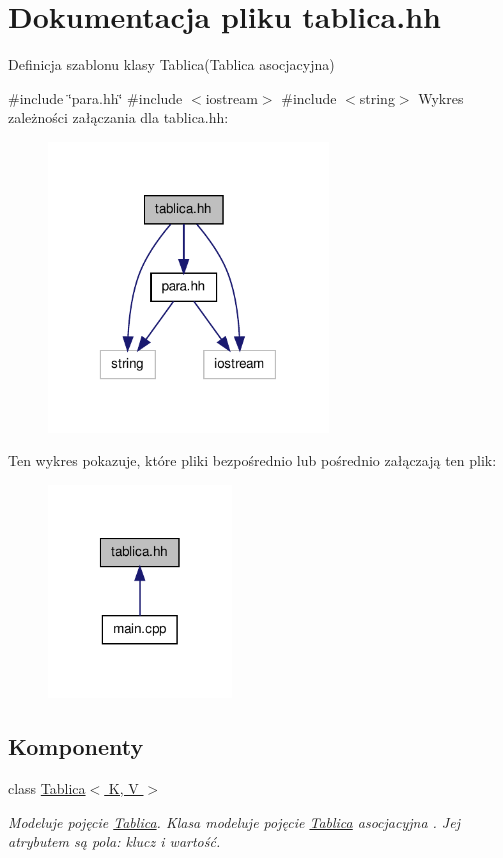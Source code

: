 \hypertarget{tablica_8hh}{\section{\-Dokumentacja pliku tablica.\-hh}
\label{tablica_8hh}
}


\-Definicja szablonu klasy \-Tablica(\-Tablica asocjacyjna)  


{\ttfamily \#include \char`\"{}para.\-hh\char`\"{}}\*
{\ttfamily \#include $<$iostream$>$}\*
{\ttfamily \#include $<$string$>$}\*
\-Wykres zależności załączania dla tablica.\-hh\-:\nopagebreak
\begin{figure}[H]
\begin{center}
\leavevmode
\includegraphics[width=211pt]{tablica_8hh__incl}
\end{center}
\end{figure}
\-Ten wykres pokazuje, które pliki bezpośrednio lub pośrednio załączają ten plik\-:\nopagebreak
\begin{figure}[H]
\begin{center}
\leavevmode
\includegraphics[width=138pt]{tablica_8hh__dep__incl}
\end{center}
\end{figure}
\subsection*{\-Komponenty}
\begin{DoxyCompactItemize}
\item 
class \hyperlink{class_tablica}{\-Tablica$<$ K, V $>$}
\begin{DoxyCompactList}\small\item\em \-Modeluje pojęcie \hyperlink{class_tablica}{\-Tablica}. \-Klasa modeluje pojęcie \hyperlink{class_tablica}{\-Tablica} asocjacyjna . \-Jej atrybutem są pola\-: klucz i wartość. \end{DoxyCompactList}\end{DoxyCompactItemize}
